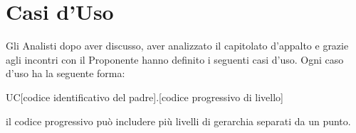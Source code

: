 \section{Casi d'Uso}
\label{sec:CasiUso}
Gli Analisti dopo aver discusso, aver analizzato il capitolato d'appalto e grazie agli incontri con il Proponente hanno definito i seguenti casi d'uso.
Ogni caso d'uso ha la seguente forma:
\begin{center}
	UC[codice identificativo del padre].[codice progressivo di livello]
\end{center}
il codice progressivo può includere più livelli di gerarchia separati da un punto.
